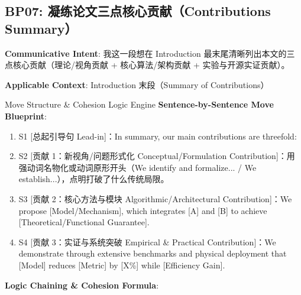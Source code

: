 \subsection{BP07: 凝练论文三点核心贡献（Contributions Summary）}\label{sec:bp:BP07}
\noindent\textbf{\color{AcadNavy}Communicative Intent}: 我这一段想在 Introduction 最末尾清晰列出本文的三点核心贡献（理论/视角贡献 + 核心算法/架构贡献 + 实验与开源实证贡献）。\par\vspace{2pt}
\noindent\textbf{\color{AcadSlate}Applicable Context}: Introduction 末段（Summary of Contributions）\par\vspace{4pt}
\begin{ConceptBox}{Move Structure \& Cohesion Logic Engine}
\textbf{Sentence-by-Sentence Move Blueprint}:
\begin{enumerate}[label=\textbf{\color{AcadNavy}S\arabic*.}, leftmargin=2em, itemsep=2pt]
  \item S1 [总起引导句 Lead-in]：In summary, our main contributions are threefold:
  \item S2 [贡献 1：新视角/问题形式化 Conceptual/Formulation Contribution]：用强动词名物化或动词原形开头（We identify and formalize... / We establish...），点明打破了什么传统局限。
  \item S3 [贡献 2：核心方法与模块 Algorithmic/Architectural Contribution]：We propose [Model/Mechanism], which integrates [A] and [B] to achieve [Theoretical/Functional Guarantee].
  \item S4 [贡献 3：实证与系统突破 Empirical \& Practical Contribution]：We demonstrate through extensive benchmarks and physical deployment that [Model] reduces [Metric] by [X\%] while [Efficiency Gain].
\end{enumerate}\par\vspace{4pt}
\textbf{Logic Chaining \& Cohesion Formula}:\par{}
\end{ConceptBox}
